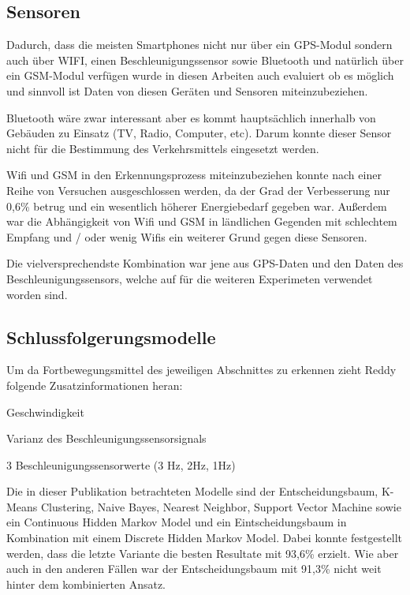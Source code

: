 \subsection{Sensoren}
Dadurch, dass die meisten Smartphones nicht nur über ein GPS-Modul sondern auch über WIFI, einen Beschleunigungssensor sowie Bluetooth und natürlich über ein GSM-Modul verfügen wurde in diesen Arbeiten auch evaluiert ob es möglich und sinnvoll ist Daten von diesen Geräten und Sensoren miteinzubeziehen. 

Bluetooth  wäre zwar interessant aber es kommt hauptsächlich innerhalb von Gebäuden zu Einsatz (TV, Radio, Computer, etc). Darum konnte dieser Sensor nicht für die Bestimmung des Verkehrsmittels eingesetzt werden. 

Wifi und GSM in den Erkennungsprozess miteinzubeziehen konnte nach einer Reihe von Versuchen ausgeschlossen werden, da der Grad der Verbesserung nur 0,6\% betrug und ein wesentlich höherer Energiebedarf gegeben war. Außerdem war die Abhängigkeit von Wifi und GSM in ländlichen Gegenden mit schlechtem Empfang und / oder wenig Wifis ein weiterer Grund gegen diese Sensoren.

Die vielversprechendste Kombination war jene aus GPS-Daten und den Daten des Beschleunigungssensors, welche auf für die weiteren Experimeten verwendet worden sind.

\subsection{Schlussfolgerungsmodelle}
Um da Fortbewegungsmittel des jeweiligen Abschnittes zu erkennen zieht Reddy folgende Zusatzinformationen heran:

\begin{pitemize}
\item Geschwindigkeit
\item Varianz des Beschleunigungssensorsignals
\item 3 Beschleunigungssensorwerte (3 Hz, 2Hz, 1Hz)
\end{pitemize}

Die in dieser Publikation betrachteten Modelle sind der Entscheidungsbaum, K-Means Clustering, Naive Bayes, Nearest Neighbor, Support Vector Machine sowie ein Continuous Hidden Markov Model und ein Eintscheidungsbaum in Kombination mit einem Discrete Hidden Markov Model. Dabei konnte festgestellt werden, dass die letzte Variante die besten Resultate mit 93,6\% erzielt. Wie aber auch in den anderen Fällen war der Entscheidungsbaum mit 91,3\% nicht weit hinter dem kombinierten Ansatz.
